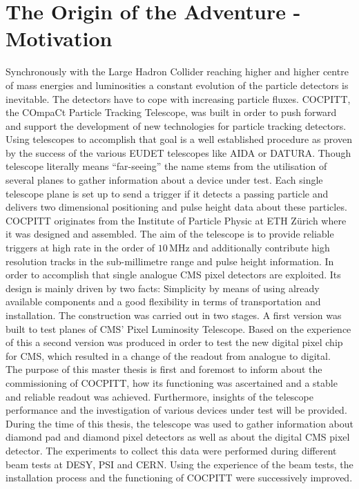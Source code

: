 \documentclass[british,11pt,a4paper]{memoir}
\begin{document}
\chapter{The Origin of the Adventure - Motivation}
Synchronously with the Large Hadron Collider reaching higher and higher centre of mass energies and luminosities a constant evolution of the particle detectors is inevitable. The detectors have to cope with increasing particle fluxes. COCPITT, the COmpaCt Particle Tracking Telescope, was built in order to push forward and support the development of new technologies for particle tracking detectors. Using telescopes to accomplish that goal is a well established procedure as proven by the success of the various EUDET telescopes like AIDA or DATURA. Though telescope literally means ``far-seeing'' the name stems from the utilisation of several planes to gather information about a device under test. Each single telescope plane is set up to send a trigger if it detects a passing particle and delivers two dimensional positioning and pulse height data about these particles.\\
COCPITT originates from the Institute of Particle Physic at ETH Z{\"u}rich where it was designed and assembled. The aim of the telescope is to provide reliable triggers at high rate in the order of $10\,$MHz and additionally contribute high resolution tracks in the sub-millimetre range and pulse height information. In order to accomplish that single analogue CMS pixel detectors are exploited. Its design is mainly driven by two facts: Simplicity by means of using already available components and a good flexibility in terms of transportation and installation. The construction was carried out in two stages. A first version was built to test planes of CMS' Pixel Luminosity Telescope. Based on the experience of this a second version was produced in order to test the new digital pixel chip for CMS, which resulted in a change of the readout from analogue to digital.\\
The purpose of this master thesis is first and foremost to inform about the commissioning of COCPITT, how its functioning was ascertained and a stable and reliable readout was achieved. Furthermore, insights of the telescope performance and the investigation of various devices under test will be provided. During the time of this thesis, the telescope was used to gather information about diamond pad and diamond pixel detectors as well as about the digital CMS pixel detector. The experiments to collect this data were performed during different beam tests at DESY, PSI and CERN. Using the experience of the beam tests, the installation process and the functioning of COCPITT were successively improved.
\end{document}
